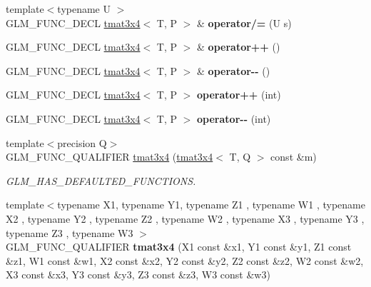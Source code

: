 \begin{DoxyCompactItemize}
\item 
\hypertarget{structglm_1_1tmat3x4_a378211e46414746911e99ed1499a12bf}{{\footnotesize template$<$typename U $>$ }\\G\-L\-M\-\_\-\-F\-U\-N\-C\-\_\-\-D\-E\-C\-L \hyperlink{structglm_1_1tmat3x4}{tmat3x4}$<$ T, P $>$ \& {\bfseries operator/=} (U s)}\label{structglm_1_1tmat3x4_a378211e46414746911e99ed1499a12bf}

\item 
\hypertarget{structglm_1_1tmat3x4_ac24005ff599f4b6d3110d252c6b173ea}{G\-L\-M\-\_\-\-F\-U\-N\-C\-\_\-\-D\-E\-C\-L \hyperlink{structglm_1_1tmat3x4}{tmat3x4}$<$ T, P $>$ \& {\bfseries operator++} ()}\label{structglm_1_1tmat3x4_ac24005ff599f4b6d3110d252c6b173ea}

\item 
\hypertarget{structglm_1_1tmat3x4_a5198a23b569931c189191afb025d46e2}{G\-L\-M\-\_\-\-F\-U\-N\-C\-\_\-\-D\-E\-C\-L \hyperlink{structglm_1_1tmat3x4}{tmat3x4}$<$ T, P $>$ \& {\bfseries operator-\/-\/} ()}\label{structglm_1_1tmat3x4_a5198a23b569931c189191afb025d46e2}

\item 
\hypertarget{structglm_1_1tmat3x4_a6c7a0194f873068b10b4e1404cba0a89}{G\-L\-M\-\_\-\-F\-U\-N\-C\-\_\-\-D\-E\-C\-L \hyperlink{structglm_1_1tmat3x4}{tmat3x4}$<$ T, P $>$ {\bfseries operator++} (int)}\label{structglm_1_1tmat3x4_a6c7a0194f873068b10b4e1404cba0a89}

\item 
\hypertarget{structglm_1_1tmat3x4_a21eeeba593a5e46ece34f418f43f7a3b}{G\-L\-M\-\_\-\-F\-U\-N\-C\-\_\-\-D\-E\-C\-L \hyperlink{structglm_1_1tmat3x4}{tmat3x4}$<$ T, P $>$ {\bfseries operator-\/-\/} (int)}\label{structglm_1_1tmat3x4_a21eeeba593a5e46ece34f418f43f7a3b}

\item 
\hypertarget{structglm_1_1tmat3x4_a2f48d00df66c48b9d37f53aed6bcdec7}{{\footnotesize template$<$precision Q$>$ }\\G\-L\-M\-\_\-\-F\-U\-N\-C\-\_\-\-Q\-U\-A\-L\-I\-F\-I\-E\-R \hyperlink{structglm_1_1tmat3x4_a2f48d00df66c48b9d37f53aed6bcdec7}{tmat3x4} (\hyperlink{structglm_1_1tmat3x4}{tmat3x4}$<$ T, Q $>$ const \&m)}\label{structglm_1_1tmat3x4_a2f48d00df66c48b9d37f53aed6bcdec7}

\begin{DoxyCompactList}\small\item\em G\-L\-M\-\_\-\-H\-A\-S\-\_\-\-D\-E\-F\-A\-U\-L\-T\-E\-D\-\_\-\-F\-U\-N\-C\-T\-I\-O\-N\-S. \end{DoxyCompactList}\item 
\hypertarget{structglm_1_1tmat3x4_a283398401e4d91c99457e60ccadee510}{{\footnotesize template$<$typename X1, typename Y1, typename Z1 , typename W1 , typename X2 , typename Y2 , typename Z2 , typename W2 , typename X3 , typename Y3 , typename Z3 , typename W3 $>$ }\\G\-L\-M\-\_\-\-F\-U\-N\-C\-\_\-\-Q\-U\-A\-L\-I\-F\-I\-E\-R {\bfseries tmat3x4} (X1 const \&x1, Y1 const \&y1, Z1 const \&z1, W1 const \&w1, X2 const \&x2, Y2 const \&y2, Z2 const \&z2, W2 const \&w2, X3 const \&x3, Y3 const \&y3, Z3 const \&z3, W3 const \&w3)}\label{structglm_1_1tmat3x4_a283398401e4d91c99457e60ccadee510}


\end{DoxyCompactItemize}
